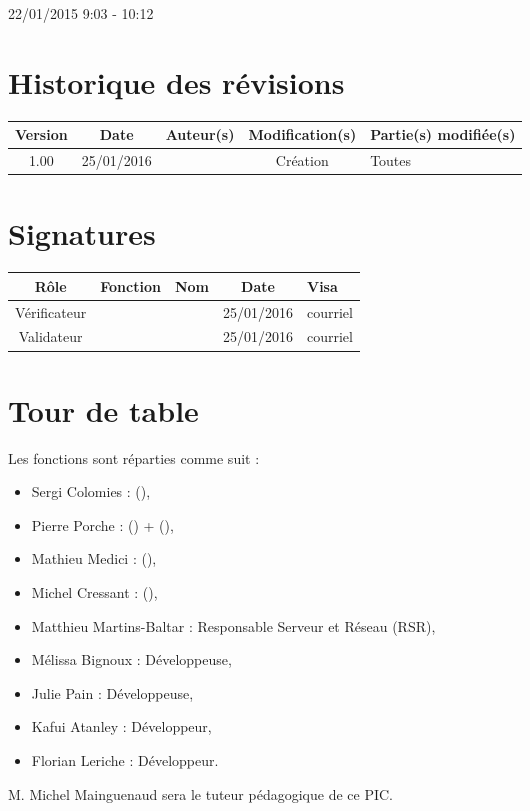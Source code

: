 \documentclass [a4paper] {article}
\begin{document}
22/01/2015			 				%
\hfill   
\hfill 	 9:03 - 10:12 				%


\section*{Historique des révisions}
\begin{center}
			\begin{tabular}{| c | c | c | c | p{4cm} |}
				\hline
				\rowcolor{Gray}
				Version & Date & Auteur(s) & Modification(s) & Partie(s) modifiée(s)		 \\
				\hline
				1.00 & 25/01/2016 & \Pierre & Création & Toutes \\
		\hline		
			\end{tabular}
		\end{center}

\section*{Signatures}

		\begin{center}
			\begin{tabular}{| c | c | c | c | p{4cm} |}
				\hline
				\rowcolor{Gray}
				Rôle & Fonction & Nom & Date & Visa		 \\
				\hline
				Vérificateur & \RQA & \Kafui & 25/01/2016 & courriel \\[30pt]
				\hline
				Validateur & \CP & \Sergi & 25/01/2016 & courriel \\[30pt]	
				\hline
			\end{tabular}
		\end{center}


\section{Tour de table}
Les fonctions sont réparties comme suit :
\begin{itemize}
	\item Sergi Colomies : \CP (\CPCourt),
	\item Pierre Porche : \RQ (\RQCourt) + \CPA (\CPACourt),
	\item Mathieu Medici : \RGC (\RGCCourt),
	\item Michel Cressant : \RD (\RDCourt),
	\item Matthieu Martins-Baltar : Responsable Serveur et Réseau (RSR),		
	\item Mélissa Bignoux : Développeuse,
	\item Julie Pain : Développeuse,
	\item Kafui Atanley : Développeur,
	\item Florian Leriche : Développeur.


\end{itemize}
M. Michel Mainguenaud sera le tuteur pédagogique de ce PIC.
\end{document}
